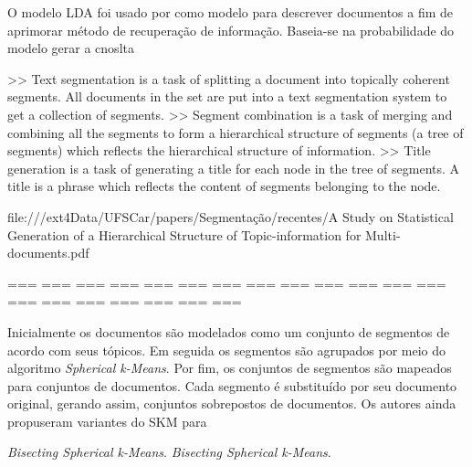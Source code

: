 




O modelo LDA foi usado por \cite{XINGWEI} como modelo para descrever documentos a fim de aprimorar método de recuperação de informação. Baseia-se na probabilidade do modelo gerar a cnoslta

















>> Text segmentation is a task of splitting a document into topically coherent segments.  All documents in the set are put into a text segmentation system to get a collection of segments.
>> Segment combination is a task of merging and combining all the segments to form a hierarchical structure of segments (a tree of segments) which reflects the hierarchical structure of information.
>> Title generation is a task of generating a title for each node in the tree of segments. A title is a phrase which reflects the content of segments belonging to the node.


file:///ext4Data/UFSCar/papers/Segmentação/recentes/A Study on Statistical Generation of a Hierarchical Structure of Topic-information for Multi-documents.pdf
~\cite{NGUYEN Viet Cuong}

=== === === === === === === === === === === === === === === === === === === === 



Inicialmente os documentos são modelados como um conjunto de segmentos de acordo com seus tópicos. Em seguida os segmentos são agrupados por meio do algoritmo \textit{Spherical k-Means}\cite{I. S. Dhillon and D. S. Modha,   Y. Zhao and G. Karypis}. Por fim, os conjuntos de segmentos são mapeados para conjuntos de documentos. Cada segmento é substituído por seu documento original, gerando assim, conjuntos sobrepostos de documentos. Os autores ainda propuseram variantes do SKM para 


\textit{Bisecting Spherical k-Means}\cite{Y. Zhao and G. Karypis}.
\textit{Bisecting Spherical k-Means}\cite{I. S. Dhillon and D. S. Modha,   Y. Zhao and G. Karypis}.

